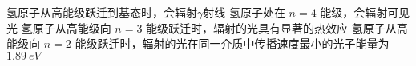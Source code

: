 \begin{enumerate}
\fourchoices
{氢原子从高能级跃迁到基态时，会辐射$ \gamma $射线}
{氢原子处在 $ n=4 $ 能级，会辐射可见光}
{氢原子从高能级向 $ n=3 $ 能级跃迁时，辐射的光具有显著的热效应}
{氢原子从高能级向 $ n=2 $ 能级跃迁时，辐射的光在同一介质中传播速度最小的光子能量为 $ 1.89 \ eV $}




	
\end{enumerate}

